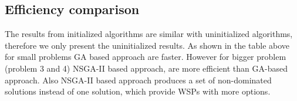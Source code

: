 \documentclass{llncs}
\begin{document}
\subsection{Efficiency comparison}
\begin{table}[h]
	\caption{Execution Time (s)}
\end{table}
The results from initialized algorithms are similar with uninitialized algorithms, therefore we only present the uninitialized results.
As shown in the table above for small problems GA based approach are faster. However for bigger problem (problem 3 and 4) NSGA-II based approach, are more efficient than GA-based approach. 
Also NSGA-II based approach produces a set of 
non-dominated solutions instead of one solution, which provide WSPs with more options.
\end{document}
